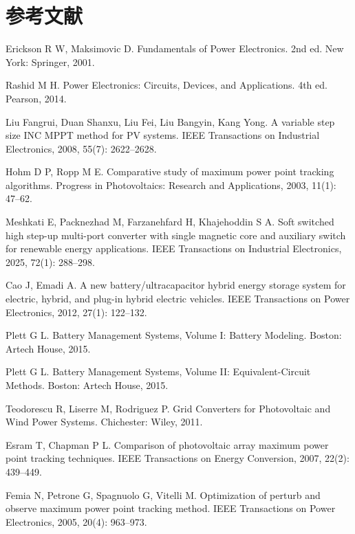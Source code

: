 ﻿%
\section*{参考文献}

\begin{enumerate}[label={[\arabic*]}, leftmargin=*, itemsep=0.6ex]
  \item Erickson R W, Maksimovic D. Fundamentals of Power Electronics. 2nd ed. New York: Springer, 2001.
  \item Rashid M H. Power Electronics: Circuits, Devices, and Applications. 4th ed. Pearson, 2014.
  \item Liu Fangrui, Duan Shanxu, Liu Fei, Liu Bangyin, Kang Yong. A variable step size INC MPPT method for PV systems. IEEE Transactions on Industrial Electronics, 2008, 55(7): 2622--2628.
  \item Hohm D P, Ropp M E. Comparative study of maximum power point tracking algorithms. Progress in Photovoltaics: Research and Applications, 2003, 11(1): 47--62.
  \item Meshkati E, Packnezhad M, Farzanehfard H, Khajehoddin S A. Soft switched high step-up multi-port converter with single magnetic core and auxiliary switch for renewable energy applications. IEEE Transactions on Industrial Electronics, 2025, 72(1): 288--298.
  \item Cao J, Emadi A. A new battery/ultracapacitor hybrid energy storage system for electric, hybrid, and plug-in hybrid electric vehicles. IEEE Transactions on Power Electronics, 2012, 27(1): 122--132.
  \item Plett G L. Battery Management Systems, Volume I: Battery Modeling. Boston: Artech House, 2015.
  \item Plett G L. Battery Management Systems, Volume II: Equivalent-Circuit Methods. Boston: Artech House, 2015.
  \item Teodorescu R, Liserre M, Rodriguez P. Grid Converters for Photovoltaic and Wind Power Systems. Chichester: Wiley, 2011.
  \item Esram T, Chapman P L. Comparison of photovoltaic array maximum power point tracking techniques. IEEE Transactions on Energy Conversion, 2007, 22(2): 439--449.
  \item Femia N, Petrone G, Spagnuolo G, Vitelli M. Optimization of perturb and observe maximum power point tracking method. IEEE Transactions on Power Electronics, 2005, 20(4): 963--973.

\end{enumerate}
